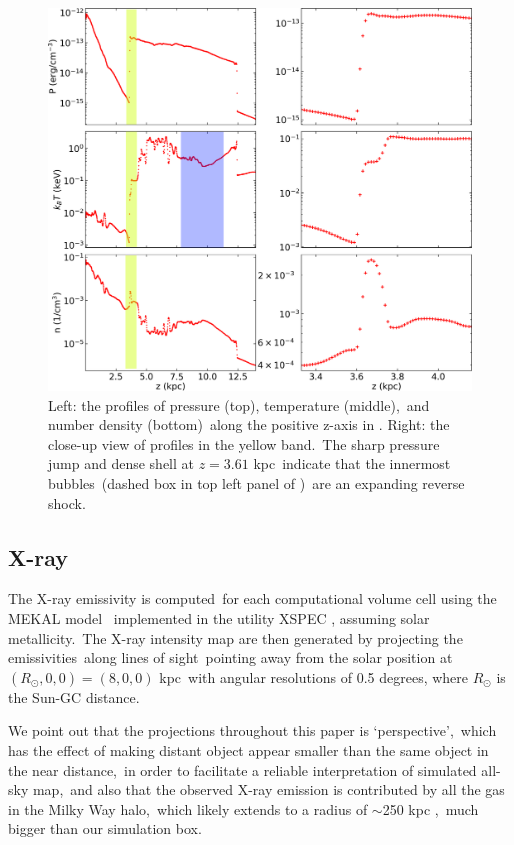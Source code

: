 \documentclass[twocolumn]{aastex631}
\begin{document}
  \begin{figure}
    \includegraphics[width=\columnwidth]{figures/fig__profile.png}
    \caption{
             Left: the profiles of pressure (top), temperature (middle),\
             and number density (bottom)\
             along the positive z-axis in .
             Right: the close-up view of profiles in the yellow band.\
             The sharp pressure jump and dense shell at $z=3.61$ kpc\
             indicate that the innermost bubbles\
             (dashed box in top left panel of )\
             are an expanding reverse shock.\
     }
    \label{fig__profile}
  \end{figure}

  \subsection{X-ray}
  \label{X-ray}
  The X-ray emissivity is computed\
  for each computational volume cell
  using the MEKAL model \citep{Xray-1,Xray-2,Xray-3}\
  implemented in the utility XSPEC \citep{XSPEC}, assuming solar metallicity.\
  The X-ray intensity map are then generated by projecting the emissivities\
  along lines of sight\
  pointing away from the solar position at $(R_{\odot},0,0)=(8,0,0)$ kpc\
  with angular resolutions of 0.5 degrees, where $R_{\odot}$ is the Sun-GC distance.

  We point out that the projections throughout this paper is \lq perspective\rq,\
  which has the effect of making distant object appear smaller than the same object in the near distance,\
  in order to facilitate a reliable interpretation of simulated all-sky map,\
  and also that the observed X-ray emission is contributed by all the gas in the Milky Way halo,\
  which likely extends to a radius of $\sim$250 kpc \citep{halo-radius-1,halo-radius-2},\
  much bigger than our simulation box.
\end{document}
